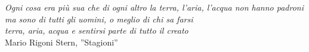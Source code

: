 \begin{titlepage}

\nonumber
\null {}
	\begin{flushright}
\textit{Ogni cosa era più sua che di ogni altro
la terra, l'aria, l'acqua non hanno padroni\\
ma sono di tutti gli uomini, o meglio di chi sa farsi\\
terra, aria, acqua e sentirsi parte di tutto il creato} \\[5mm]
	Mario Rigoni Stern, ''Stagioni''
	\end{flushright}
\null

\end{titlepage}
\cleardoublepage